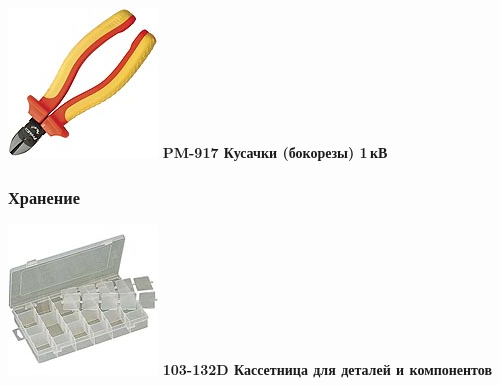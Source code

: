 \documentclass{magazine}
\begin{document}
{\begin{multicols}{2}
\noindent\includegraphics[width=\columnwidth]{fig/00/pros/PM-917.jpg}
\textbf{PM-917 Кусачки (бокорезы) 1\,кВ}

\subsubsection{Хранение}

\noindent\includegraphics[width=\columnwidth]{fig/00/pros/103-132D.jpg}
\textbf{103-132D Кассетница для деталей и компонентов}


\end{multicols}}
\end{document}
